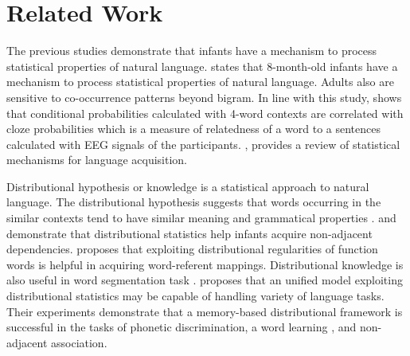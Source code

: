 \section{Related Work}

The previous studies demonstrate that infants have a mechanism to process
statistical properties of natural language. \cite{saffran1996statistical} 
states that 8-month-old infants have a mechanism to process
statistical properties of natural language. Adults also
are sensitive to co-occurrence patterns beyond bigram. In line
with this study, \cite{hahn2012measuring} shows that conditional probabilities
calculated with 4-word contexts are correlated with cloze probabilities 
which is a measure of relatedness of a word to a sentences calculated
with EEG signals of the participants. \cite{arnon2010more},\cite{romberg2010statistical} 
provides a review of statistical mechanisms for language acquisition.

Distributional hypothesis or knowledge is a statistical approach to natural
language. The distributional hypothesis suggests that words 
occurring in the similar contexts tend to have similar meaning 
and grammatical properties \cite{harris1954word}. 
\cite{gomez2002variability} and \cite{van2010linking} demonstrate
that distributional statistics help infants acquire non-adjacent
dependencies. \cite{monaghan2012integrating} proposes that
exploiting distributional regularities of function words is helpful in acquiring word-referent
mappings. Distributional knowledge is also useful in word segmentation task \cite{saffran1996word}.
\cite{thiessen2012iminerva} proposes that an unified model exploiting distributional
statistics may be capable of handling variety of language tasks. Their experiments
demonstrate that a memory-based distributional framework is 
successful in the tasks of phonetic discrimination, a word learning , and non-adjacent
association.

